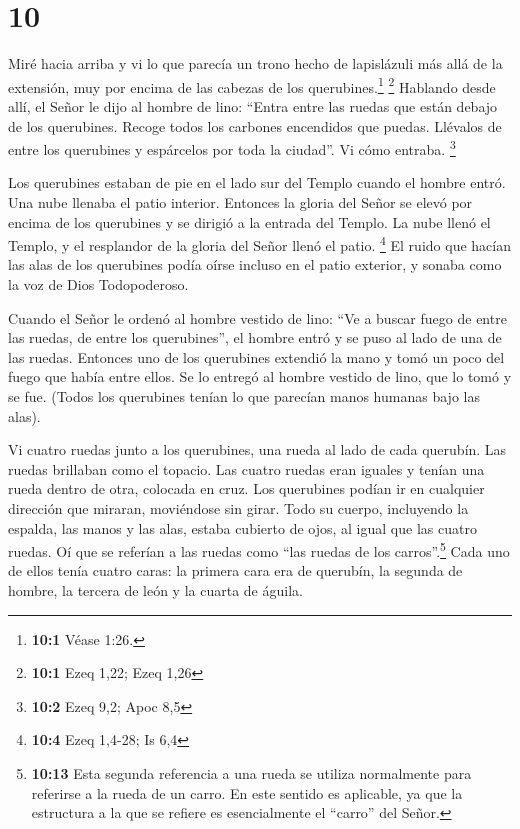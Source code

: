 \hypertarget{section-9}{%
\section{10}\label{section-9}}

 Miré hacia arriba y vi lo que parecía un trono hecho de
lapislázuli más allá de la extensión, muy por encima de las cabezas de
los querubines.\footnote{\textbf{10:1} Véase 1:26.} \footnote{\textbf{10:1}
  Ezeq 1,22; Ezeq 1,26}  Hablando desde allí, el Señor le
dijo al hombre de lino: ``Entra entre las ruedas que están debajo de los
querubines. Recoge todos los carbones encendidos que puedas. Llévalos de
entre los querubines y espárcelos por toda la ciudad''. Vi cómo entraba.
\footnote{\textbf{10:2} Ezeq 9,2; Apoc 8,5}

 Los querubines estaban de pie en el lado sur del Templo
cuando el hombre entró. Una nube llenaba el patio interior.
 Entonces la gloria del Señor se elevó por encima de los
querubines y se dirigió a la entrada del Templo. La nube llenó el
Templo, y el resplandor de la gloria del Señor llenó el patio.
\footnote{\textbf{10:4} Ezeq 1,4-28; Is 6,4}  El ruido que
hacían las alas de los querubines podía oírse incluso en el patio
exterior, y sonaba como la voz de Dios Todopoderoso.

 Cuando el Señor le ordenó al hombre vestido de lino: ``Ve
a buscar fuego de entre las ruedas, de entre los querubines'', el hombre
entró y se puso al lado de una de las ruedas.  Entonces
uno de los querubines extendió la mano y tomó un poco del fuego que
había entre ellos. Se lo entregó al hombre vestido de lino, que lo tomó
y se fue.  (Todos los querubines tenían lo que parecían
manos humanas bajo las alas).

 Vi cuatro ruedas junto a los querubines, una rueda al
lado de cada querubín. Las ruedas brillaban como el topacio.
 Las cuatro ruedas eran iguales y tenían una rueda dentro
de otra, colocada en cruz.  Los querubines podían ir en
cualquier dirección que miraran, moviéndose sin girar. 
Todo su cuerpo, incluyendo la espalda, las manos y las alas, estaba
cubierto de ojos, al igual que las cuatro ruedas.  Oí que
se referían a las ruedas como ``las ruedas de los carros''.\footnote{\textbf{10:13}
  Esta segunda referencia a una rueda se utiliza normalmente para
  referirse a la rueda de un carro. En este sentido es aplicable, ya que
  la estructura a la que se refiere es esencialmente el ``carro'' del
  Señor.}  Cada uno de ellos tenía cuatro caras: la
primera cara era de querubín, la segunda de hombre, la tercera de león y
la cuarta de águila.

